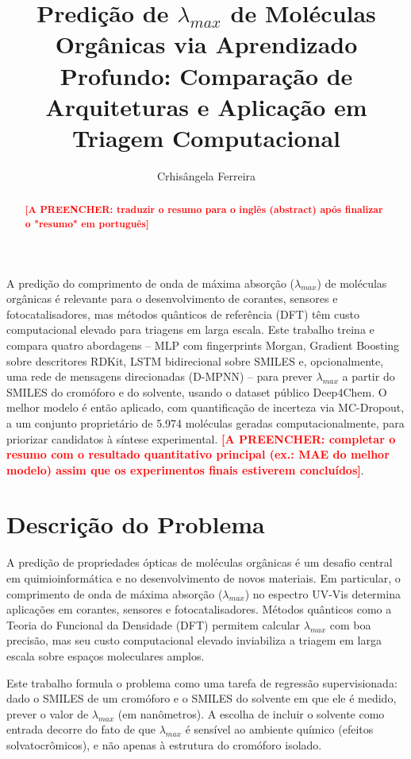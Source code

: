 \documentclass[12pt]{article}
\title{Predição de $\lambda_{max}$ de Moléculas Orgânicas via Aprendizado Profundo: Comparação de Arquiteturas e Aplicação em Triagem Computacional}
\author{Crhisângela Ferreira\inst{1}}
\newcommand{\preencher}[1]{\textcolor{red}{\bfseries [A PREENCHER: #1]}}
\begin{document}
\maketitle

\begin{resumo}
  A predição do comprimento de onda de máxima absorção ($\lambda_{max}$) de moléculas
  orgânicas é relevante para o desenvolvimento de corantes, sensores e fotocatalisadores,
  mas métodos quânticos de referência (DFT) têm custo computacional elevado para triagens
  em larga escala. Este trabalho treina e compara quatro abordagens -- MLP com fingerprints
  Morgan, Gradient Boosting sobre descritores RDKit, LSTM bidirecional sobre SMILES e,
  opcionalmente, uma rede de mensagens direcionadas (D-MPNN) -- para prever $\lambda_{max}$
  a partir do SMILES do cromóforo e do solvente, usando o dataset público Deep4Chem. O
  melhor modelo é então aplicado, com quantificação de incerteza via MC-Dropout, a um
  conjunto proprietário de 5.974 moléculas geradas computacionalmente, para priorizar
  candidatos à síntese experimental. \preencher{completar o resumo com o resultado
  quantitativo principal (ex.: MAE do melhor modelo) assim que os experimentos finais
  estiverem concluídos}.
\end{resumo}

\begin{abstract}
  \preencher{traduzir o resumo para o inglês (abstract) após finalizar o "resumo" em
  português}
\end{abstract}


\section{Descrição do Problema}
\label{sec:problema}

A predição de propriedades ópticas de moléculas orgânicas é um desafio central em
quimioinformática e no desenvolvimento de novos materiais. Em particular, o comprimento
de onda de máxima absorção ($\lambda_{max}$) no espectro UV-Vis determina aplicações em
corantes, sensores e fotocatalisadores. Métodos quânticos como a Teoria do Funcional da
Densidade (DFT) permitem calcular $\lambda_{max}$ com boa precisão, mas seu custo
computacional elevado inviabiliza a triagem em larga escala sobre espaços moleculares
amplos.

Este trabalho formula o problema como uma tarefa de regressão supervisionada: dado o
SMILES de um cromóforo e o SMILES do solvente em que ele é medido, prever o valor de
$\lambda_{max}$ (em nanômetros). A escolha de incluir o solvente como entrada decorre do
fato de que $\lambda_{max}$ é sensível ao ambiente químico (efeitos solvatocrômicos), e
não apenas à estrutura do cromóforo isolado.
\end{document}

